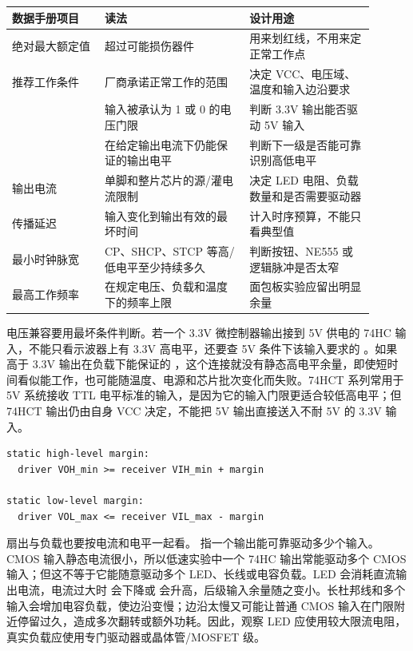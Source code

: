 \begin{longtable}{L{0.23\linewidth}L{0.36\linewidth}L{0.31\linewidth}}
\toprule
数据手册项目 & 读法 & 设计用途 \\
\midrule
绝对最大额定值 & 超过可能损伤器件 & 用来划红线，不用来定正常工作点 \\
推荐工作条件 & 厂商承诺正常工作的范围 & 决定 VCC、电压域、温度和输入边沿要求 \\
 & 输入被承认为 1 或 0 的电压门限 & 判断 3.3V 输出能否驱动 5V 输入 \\
 & 在给定输出电流下仍能保证的输出电平 & 判断下一级是否能可靠识别高低电平 \\
输出电流 & 单脚和整片芯片的源/灌电流限制 & 决定 LED 电阻、负载数量和是否需要驱动器 \\
传播延迟 & 输入变化到输出有效的最坏时间 & 计入时序预算，不能只看典型值 \\
最小时钟脉宽 & CP、SHCP、STCP 等高/低电平至少持续多久 & 判断按钮、NE555 或逻辑脉冲是否太窄 \\
最高工作频率 & 在规定电压、负载和温度下的频率上限 & 面包板实验应留出明显余量 \\
\bottomrule
\end{longtable}

电压兼容要用最坏条件判断。若一个 3.3V 微控制器输出接到 5V 供电的 74HC 输入，不能只看示波器上有 3.3V 高电平，还要查 5V 条件下该输入要求的 。如果  高于 3.3V 输出在负载下能保证的 ，这个连接就没有静态高电平余量，即使短时间看似能工作，也可能随温度、电源和芯片批次变化而失败。74HCT 系列常用于 5V 系统接收 TTL 电平标准的输入，是因为它的输入门限更适合较低高电平；但 74HCT 输出仍由自身 VCC 决定，不能把 5V 输出直接送入不耐 5V 的 3.3V 输入。

\begin{lstlisting}
static high-level margin:
  driver VOH_min >= receiver VIH_min + margin

static low-level margin:
  driver VOL_max <= receiver VIL_max - margin
\end{lstlisting}

扇出与负载也要按电流和电平一起看。 指一个输出能可靠驱动多少个输入。CMOS 输入静态电流很小，所以低速实验中一个 74HC 输出常能驱动多个 CMOS 输入；但这不等于它能随意驱动多个 LED、长线或电容负载。LED 会消耗直流输出电流，电流过大时  会下降或  会升高，后级输入余量随之变小。长杜邦线和多个输入会增加电容负载，使边沿变慢；边沿太慢又可能让普通 CMOS 输入在门限附近停留过久，造成多次翻转或额外功耗。因此，观察 LED 应使用较大限流电阻，真实负载应使用专门驱动器或晶体管/MOSFET 级。

